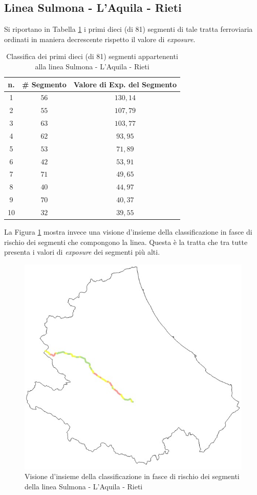 \subsection{Linea Sulmona - L'Aquila - Rieti}
Si riportano in Tabella \ref{classificasulmonarieti} i primi dieci (di 81) segmenti di tale tratta ferroviaria ordinati in maniera decrescente rispetto il valore di \textit{exposure}.
\begin{table}[hpt]
\centering
\begin{tabular}{|c|c|c|}
\hline
\rowcolor{lightgray}
n. & \# Segmento & Valore di Exp. del Segmento \\ \hline \rowcolor{flamingopink}
1  & $56$        & $130,14$                      \\ \hline \rowcolor{flamingopink}
2  & $55$        & $107,79$                      \\ \hline \rowcolor{flamingopink}
3  & $63$        & $103,77$                      \\ \hline \rowcolor{flamingopink}
4  & $62$        & $93,95$                      \\ \hline \rowcolor{flamingopink}
5  & $53$        & $71,89$                      \\ \hline \rowcolor{flamingopink}
6  & $42$        & $53,91$                      \\ \hline \rowcolor{flamingopink}
7  & $71$       & $49,65$                      \\ \hline \rowcolor{flamingopink}
8  & $40$        & $44,97$                      \\ \hline \rowcolor{flamingopink}
9  & $70$        & $40,37$                      \\ \hline \rowcolor{flamingopink}
10 & $32$        & $39,55$                      \\ \hline
\end{tabular}
\caption{Classifica dei primi dieci (di 81) segmenti appartenenti alla linea Sulmona - L'Aquila - Rieti}
\label{classificasulmonarieti}
\end{table}
\newline
La Figura \ref{sulmonarieti} mostra invece una visione d'insieme della classificazione in fasce di rischio dei segmenti che compongono la linea. Questa è la tratta che tra tutte presenta i valori di \textit{exposure} dei segmenti più alti. 
\begin{figure}[hpt]
\centering
\includegraphics[width=0.4\linewidth]{img/rietisulmona.jpeg}
\caption{Visione d'insieme della classificazione in fasce di rischio dei segmenti della linea Sulmona - L'Aquila - Rieti}
\label{sulmonarieti}
\end{figure}
